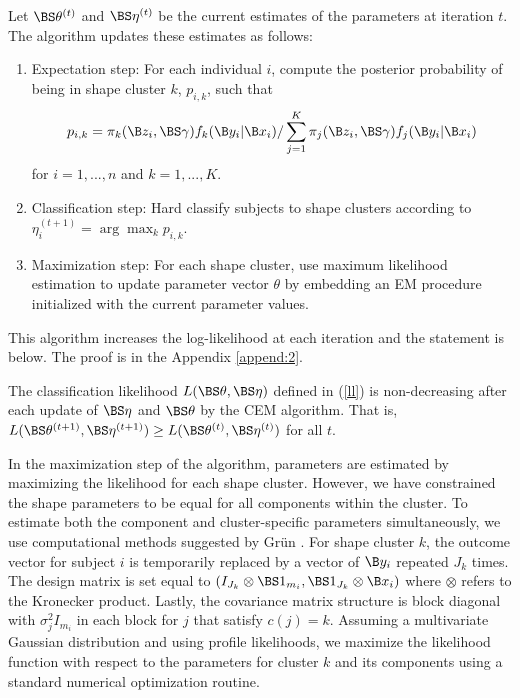 Let $\BS\theta^{(t)}$ and $\BS\eta^{(t)}$ be the current estimates of the parameters at iteration $t$. The algorithm updates these estimates as follows:
\begin{enumerate}
\item Expectation step: For each individual $i$, compute the posterior probability of being in shape cluster $k$, $p_{i,k}$, such that
$$p_{i,k}= \pi_{k}(\B z_{i},\BS\gamma)f_{k}(\B y_{i}|\B x_{i})/\sum^{K}_{j=1} \pi_{j}(\B z_{i},\BS\gamma)f_{j}(\B y_{i}|\B x_{i})$$
for $i=1,...,n$ and $k=1,...,K$.
\item Classification step: Hard classify subjects to shape clusters according to $\eta^{(t+1)}_{i} = \arg\max_{k} p_{i,k}$.
\item Maximization step: For each shape cluster, use maximum likelihood estimation to update parameter vector $\theta$ by embedding an EM procedure initialized with the current parameter values.
\end{enumerate} 
This algorithm increases the log-likelihood at each iteration and the statement is below. The proof is in the Appendix \ref{append:2}. 
\begin{theorem} The classification likelihood $L(\BS\theta,\BS\eta)$ defined in (\ref{ll}) is non-decreasing after each update of $\BS\eta$ and $\BS\theta$ by the CEM algorithm. That is, $L(\BS\theta^{(t+1)},\BS\eta^{(t+1)}) \geq L(\BS\theta^{(t)},\BS\eta^{(t)})$ for all $t$.
\end{theorem}

In the maximization step of the algorithm, parameters are estimated by maximizing the likelihood for each shape cluster. However, we have constrained the shape parameters to be equal for all components within the cluster. To estimate both the component and cluster-specific parameters simultaneously, we use computational methods suggested by Gr{\"u}n \cite{grun2008}. For shape cluster $k$, the outcome vector for subject $i$ is temporarily replaced by a vector of $\B y_{i}$ repeated $J_{k}$ times. The design matrix  is set equal to $(I_{J_{k}}\otimes \BS 1_{m_{i}}, \BS 1_{J_{k}} \otimes \B x_{i})$ where $\otimes$ refers to the Kronecker product. Lastly, the covariance matrix structure is block diagonal with $\sigma^{2}_{j}I_{m_{i}}$ in each block for $j$ that satisfy $c(j)=k$. Assuming a multivariate Gaussian distribution and using profile likelihoods, we maximize the likelihood function with respect to the parameters for cluster $k$ and its components using a standard numerical optimization routine.

